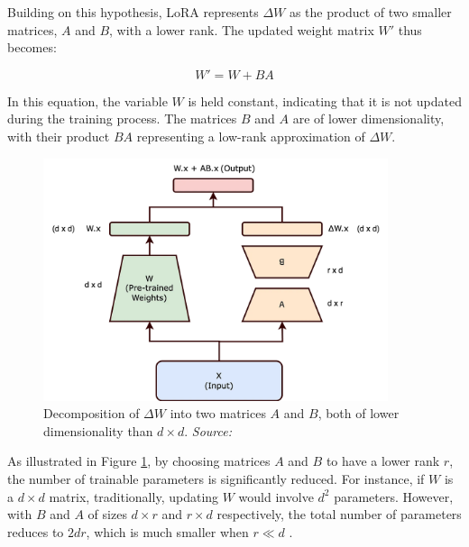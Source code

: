 Building on this hypothesis, LoRA represents \( \Delta W \) as the product of two smaller matrices, \( A \) and \( B \), with a lower rank. The updated weight matrix \( W' \) thus becomes:

\begin{equation}
    W' = W + BA
\end{equation}

In this equation, the variable \( W \) is held constant, indicating that it is not updated during the training process. The matrices \( B \) and \( A \) are of lower dimensionality, with their product \( BA \) representing a low-rank approximation of \( \Delta W \).

\begin{figure}[h]
    \centering
    \includegraphics[width=0.9\textwidth]{images/llms/lora.png}
    \caption{Decomposition of \( \Delta W \) into two matrices \( A \) and \( B \), both of lower dimensionality than \( d \times d \). \textit{Source:} \cite{towardsdatascience2024lora}}
    \label{fig:lora_decomposition}
\end{figure}

As illustrated in Figure \ref{fig:lora_decomposition}, by choosing matrices \( A \) and \( B \) to have a lower rank \( r \), the number of trainable parameters is significantly reduced. For instance, if \( W \) is a \( d \times d \) matrix, traditionally, updating \( W \) would involve \( d^2 \) parameters. However, with \( B \) and \( A \) of sizes \( d \times r \) and \( r \times d \) respectively, the total number of parameters reduces to \( 2dr \), which is much smaller when \( r \ll d \) \cite{hu2021lora}. \newline

